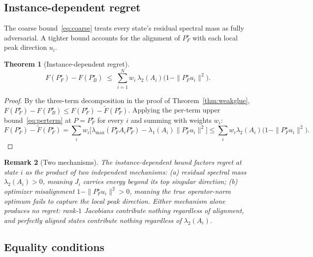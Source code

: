 \documentclass[final,3p,times]{elsarticle}
\newtheorem{theorem}{Theorem}
\newtheorem{remark}[theorem]{Remark}
\begin{document}
\subsection{Instance-dependent regret}

The coarse bound~\eqref{eq:coarse} treats every state's residual
spectral mass as fully adversarial.
A tighter bound accounts for the alignment of $P_F^\star$ with each
local peak direction $u_i$.

\begin{theorem}[Instance-dependent regret]\label{thm:instancereg}
\begin{equation}\label{eq:instreg}
F(P_F^\star)-F(P_B^\star)
\;\le\;
\sum_{i=1}^N w_i\,\lambda_2(A_i)\bigl(1-\|P_F^\star u_i\|^2\bigr).
\end{equation}
\end{theorem}

\begin{proof}
By the three-term decomposition in the proof of
Theorem~\ref{thm:weakglue}, $F(P_F^\star)-F(P_B^\star)\le
F(P_F^\star)-\tilde F(P_F^\star)$.
Applying the per-term upper bound~\eqref{eq:perterm} at $P=P_F^\star$ for
every $i$ and summing with weights $w_i$:
\[
F(P_F^\star)-\tilde F(P_F^\star)
=\sum_i w_i\bigl[\lambda_{\max}(P_F^\star A_i P_F^\star)-\lambda_1(A_i)\|P_F^\star u_i\|^2\bigr]
\le\sum_i w_i\lambda_2(A_i)\bigl(1-\|P_F^\star u_i\|^2\bigr).
\]
\end{proof}

\begin{remark}[Two mechanisms]
The instance-dependent bound factors regret at state $i$ as the product
of two independent mechanisms:
(a) residual spectral mass $\lambda_2(A_i)>0$, meaning $J_i$ carries
energy beyond its top singular direction;
(b) optimizer misalignment $1-\|P_F^\star u_i\|^2>0$, meaning the
true operator-norm optimum fails to capture the local peak direction.
Either mechanism alone produces no regret: rank-$1$ Jacobians contribute
nothing regardless of alignment, and perfectly aligned states contribute
nothing regardless of $\lambda_2(A_i)$.
\end{remark}

\subsection{Equality conditions}
\end{document}
